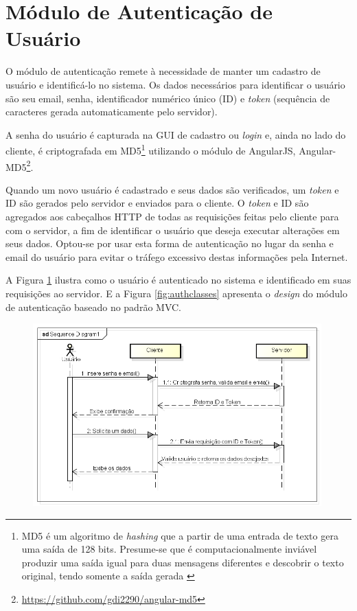 \section{Módulo de Autenticação de Usuário}
O módulo de autenticação remete à necessidade de manter um cadastro de usuário e identificá-lo no sistema. Os dados necessários para identificar o usuário são seu email, senha, identificador numérico único (ID) e \textit{token} (sequência de caracteres gerada automaticamente pelo servidor).
\par
A senha do usuário é capturada na GUI de cadastro ou \textit{login} e, ainda no lado do cliente, é criptografada em MD5\footnote{MD5 é um algoritmo de \textit{hashing} que a partir de uma entrada de texto gera uma saída de 128 bits. Presume-se que é computacionalmente inviável produzir uma saída igual para duas mensagens diferentes e descobrir o texto original, tendo somente a saída gerada \cite{rfc1321MD5}} utilizando o módulo de AngularJS, Angular-MD5\footnote{\url{https://github.com/gdi2290/angular-md5}}.
\par
Quando um novo usuário é cadastrado e seus dados são verificados, um \textit{token} e ID são gerados pelo servidor e enviados para o cliente. O \textit{token} e ID são agregados aos cabeçalhos HTTP de todas as requisições feitas pelo cliente para com o servidor, a fim de identificar o usuário que deseja executar alterações em seus dados. Optou-se por usar esta forma de autenticação no lugar da senha e email do usuário para evitar o tráfego excessivo destas informações pela Internet. 
\par
A Figura \ref{fig:authSequence} ilustra como o usuário é autenticado no sistema e identificado em suas requisições ao servidor. E a Figura \ref{fig:authclasses} apresenta o \textit{design} do módulo de autenticação baseado no padrão MVC.

\begin{figure}
\begin{minipage}{1.0\textwidth}
    \centerline{\includegraphics[width=30em]{figuras/authSequence.png}}
    \label{fig:authSequence}
\end{minipage}
\end{figure}

